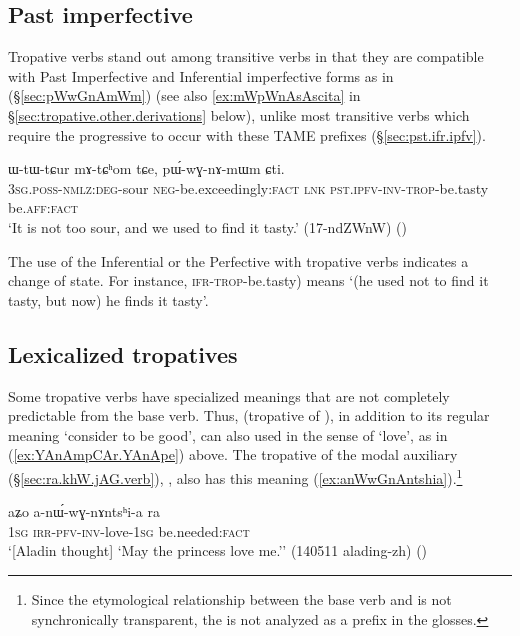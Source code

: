\subsection{Past imperfective} \label{sec:tropative.pst.ipfv}
Tropative verbs stand out among transitive verbs in that they are compatible with Past Imperfective  and Inferential imperfective  forms as in (§\ref{sec:pWwGnAmWm}) (see also \ref{ex:mWpWnAsAscita} in §\ref{sec:tropative.other.derivations} below), unlike most transitive verbs which require the progressive  to occur with these TAME prefixes (§\ref{sec:pst.ifr.ipfv}).


 \begin{exe}
\ex \label{sec:pWwGnAmWm}
\gll ɯ-tɯ-tɕur mɤ-tɕʰom tɕe, pɯ́-wɣ-nɤ-mɯm ɕti.  \\
\textsc{3sg}.\textsc{poss}-\textsc{nmlz}:\textsc{deg}-sour \textsc{neg}-be.exceedingly:\textsc{fact} \textsc{lnk} \textsc{pst}.\textsc{ipfv}-\textsc{inv}-\textsc{trop}-be.tasty be.\textsc{aff}:\textsc{fact} \\
 \glt `It is not too sour, and we used to find it tasty.' (17-ndZWnW)
 ()
\end{exe}  

The use of the Inferential or the Perfective with tropative verbs indicates a change of state. For instance,  \textsc{ifr}-\textsc{trop}-be.tasty) means `(he used not to find it tasty, but now) he finds it tasty'.
 
\subsection{Lexicalized tropatives} \label{sec:tropative.lexicalized}
Some tropative verbs have specialized meanings that are not completely predictable from the base verb. Thus,  (tropative of ), in addition to its regular meaning `consider to be good', can also used in the sense of `love', as in (\ref{ex:YAnAmpCAr.YAnApe}) above. The tropative of the modal auxiliary  (§\ref{sec:ra.khW.jAG.verb}), , also has this meaning (\ref{ex:anWwGnAntshia}).\footnote{Since the etymological relationship between the base verb   and  is not synchronically transparent, the  is not analyzed as a prefix in the glosses. }

\begin{exe}
\ex \label{ex:anWwGnAntshia}
\gll aʑo a-nɯ́-wɣ-nɤntsʰi-a ra \\
\textsc{1sg} \textsc{irr}-\textsc{pfv}-\textsc{inv}-love-\textsc{1sg} be.needed:\textsc{fact} \\
\glt `[Aladin thought] `May the princess love me.'' (140511 alading-zh)
()
\end{exe}

